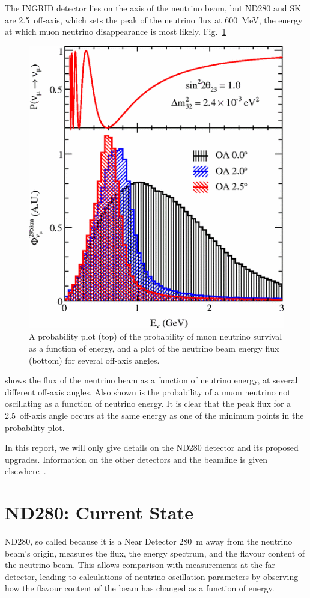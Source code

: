 \documentclass[aps,pra,12pt,notitlepage,tightenlines]{revtex4-1}
\begin{document}
The INGRID detector lies on the axis of the neutrino beam, but ND280 and SK are 2.5\degree\ off-axis, which sets the peak of the neutrino flux at 600~MeV, the energy at which muon neutrino disappearance is most likely. Fig.\ \ref{fig:axis} 
\begin{figure}
 \includegraphics[scale=0.5]{axis.png}
 \caption{A probability plot (top) of the probability of muon neutrino survival as a function of energy, and a plot of the neutrino beam energy flux (bottom) for several off-axis angles.}
 \label{fig:axis}
\end{figure}
shows the flux of the neutrino beam as a function of neutrino energy, at several different off-axis angles. Also shown is the probability of a muon neutrino not oscillating as a function of neutrino energy. It is clear that the peak flux for a 2.5\degree\ off-axis angle occurs at the same energy as one of the minimum points in the probability plot.

In this report, we will only give details on the ND280 detector and its proposed upgrades. Information on the other detectors and the beamline is given elsewhere~\cite{ABE2011106}.

\section{ND280: Current State}
ND280, so called because it is a Near Detector 280~m away from the neutrino beam's origin, measures the flux, the energy spectrum, and the flavour content of the neutrino beam. This allows comparison with measurements at the far detector, leading to calculations of neutrino oscillation parameters by observing how the flavour content of the beam has changed as a function of energy. 
\end{document}
